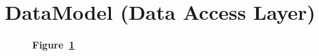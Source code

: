 \section{DataModel (Data Access Layer)}\label{sec:datamodel}

\begin{landscape}
	\begin{figure}[!h]
		\caption*{\textbf{Figure~\ref{fig:datamodel}}}
		\captionlistentry{}\label{fig:datamodel}
	\end{figure}
\end{landscape}
